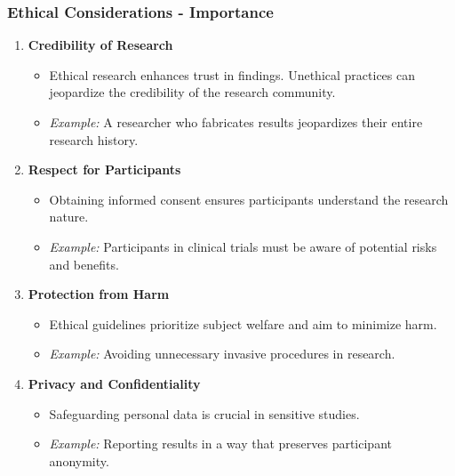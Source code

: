 \documentclass[aspectratio=169]{beamer}
\begin{document}
\begin{frame}[fragile]
    \frametitle{Ethical Considerations - Importance}
    \begin{enumerate}
        \item \textbf{Credibility of Research}
            \begin{itemize}
                \item Ethical research enhances trust in findings. Unethical practices can jeopardize the credibility of the research community.
                \item \textit{Example:} A researcher who fabricates results jeopardizes their entire research history.
            \end{itemize}
        
        \item \textbf{Respect for Participants}
            \begin{itemize}
                \item Obtaining informed consent ensures participants understand the research nature.
                \item \textit{Example:} Participants in clinical trials must be aware of potential risks and benefits.
            \end{itemize}
        
        \item \textbf{Protection from Harm}
            \begin{itemize}
                \item Ethical guidelines prioritize subject welfare and aim to minimize harm.
                \item \textit{Example:} Avoiding unnecessary invasive procedures in research.
            \end{itemize}
        
        \item \textbf{Privacy and Confidentiality}
            \begin{itemize}
                \item Safeguarding personal data is crucial in sensitive studies.
                \item \textit{Example:} Reporting results in a way that preserves participant anonymity.
            \end{itemize}
    \end{enumerate}
\end{frame}
\end{document}
